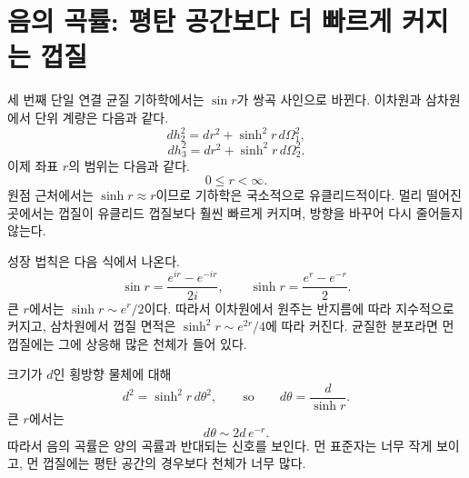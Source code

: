 \section{음의 곡률: 평탄 공간보다 더 빠르게 커지는 껍질}

세 번째 단일 연결 균질 기하학에서는 \(\sin r\)가 쌍곡 사인으로 바뀐다. 이차원과 삼차원에서 단위 계량은 다음과 같다.
\begin{equation}
dh_2^2 = dr^2 + \sinh^2 r\, d\Omega_1^2,
\label{eq:c03-hyperbolic-two}
\end{equation}
\begin{equation}
dh_3^2 = dr^2 + \sinh^2 r\, d\Omega_2^2.
\label{eq:c03-hyperbolic-three}
\end{equation}
이제 좌표 \(r\)의 범위는 다음과 같다.
\begin{equation}
0\le r<\infty.
\end{equation}
원점 근처에서는 \(\sinh r\approx r\)이므로 기하학은 국소적으로 유클리드적이다. 멀리 떨어진 곳에서는 껍질이 유클리드 껍질보다 훨씬 빠르게 커지며, 방향을 바꾸어 다시 줄어들지 않는다.

성장 법칙은 다음 식에서 나온다.
\begin{equation}
\sin r = \frac{e^{ir}-e^{-ir}}{2i},
\qquad
\sinh r = \frac{e^r-e^{-r}}{2}.
\label{eq:c03-sin-sinh}
\end{equation}
큰 \(r\)에서는 \(\sinh r\sim e^r/2\)이다. 따라서 이차원에서 원주는 반지름에 따라 지수적으로 커지고, 삼차원에서 껍질 면적은 \(\sinh^2r\sim e^{2r}/4\)에 따라 커진다. 균질한 분포라면 먼 껍질에는 그에 상응해 많은 천체가 들어 있다.

크기가 \(d\)인 횡방향 물체에 대해
\begin{equation}
d^2 = \sinh^2 r\, d\theta^2,
\qquad\text{so}\qquad
d\theta = \frac{d}{\sinh r}.
\label{eq:c03-hyperbolic-angle}
\end{equation}
큰 \(r\)에서는
\begin{equation}
d\theta \sim 2d\,e^{-r}.
\end{equation}
따라서 음의 곡률은 양의 곡률과 반대되는 신호를 보인다. 먼 표준자는 너무 작게 보이고, 먼 껍질에는 평탄 공간의 경우보다 천체가 너무 많다.

\begin{classroomqa}\end{classroomqa}

